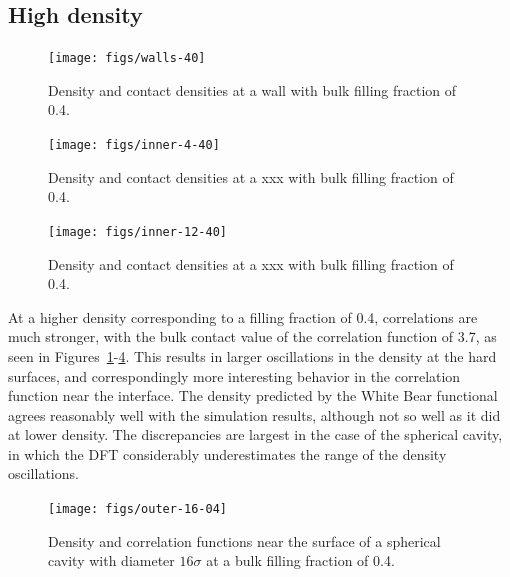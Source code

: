 \documentclass[letterpaper,twocolumn,amsmath,amssymb,jcp,10pt,aip]{revtex4-1}
\begin{document}

\subsection{High density}

\begin{figure}
  \texttt{[image: figs/walls-40]}
  \caption{Density and contact densities at a wall with bulk filling
    fraction of 0.4.}
  \label{fig:walls-40}
\end{figure}

\begin{figure}
  \texttt{[image: figs/inner-4-40]}
  \caption{Density and contact densities at a xxx with bulk filling
    fraction of 0.4.}
  \label{fig:inner-4-40}
\end{figure}

\begin{figure}
  \texttt{[image: figs/inner-12-40]}
  \caption{Density and contact densities at a xxx with bulk filling
    fraction of 0.4.}
  \label{fig:inner-12-40}
\end{figure}

At a higher density corresponding to a filling fraction of 0.4,
correlations are much stronger, with the bulk contact value of the
correlation function of 3.7, as seen in
Figures~\ref{fig:walls-40}-\ref{fig:outer-40}.  This results in larger
oscillations in the density at the hard surfaces, and correspondingly
more interesting behavior in the correlation function near the
interface.  The density predicted by the White Bear functional agrees
reasonably well with the simulation results, although not so well as
it did at lower density.  The discrepancies are largest in the case of
the spherical cavity, in which the DFT considerably underestimates the
range of the density oscillations.

\begin{figure}
  \texttt{[image: figs/outer-16-04]}
  \caption{Density and correlation functions near the surface of a
    spherical cavity with diameter $16\sigma$ at a bulk filling
    fraction of 0.4.}
  \label{fig:outer-40}
\end{figure}
\end{document}
